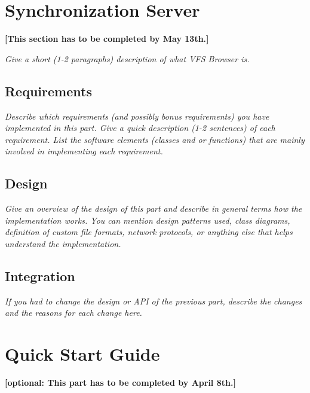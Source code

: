 \documentclass[a4paper,12pt]{article}
\begin{document}
\section{Synchronization Server}

\textbf{[This section has to be completed by May 13th.]}

\emph{Give a short (1-2 paragraphs) description of what VFS Browser is.}


\subsection{Requirements}

\emph{Describe which requirements (and possibly bonus requirements) you have implemented in this part. Give a quick description (1-2 sentences) of each requirement. List the software elements (classes and or functions) that are mainly involved in implementing each requirement.}


\subsection{Design}

\emph{Give an overview of the design of this part and describe in general terms how the implementation works. You can mention design patterns used, class diagrams, definition of custom file formats, network protocols, or anything else that helps understand the implementation.}


\subsection{Integration}

\emph{If you had to change the design or API of the previous part, describe the changes and the reasons for each change here.}




\section{Quick Start Guide}

\textbf{[optional: This part has to be completed by April 8th.]}
\end{document}
